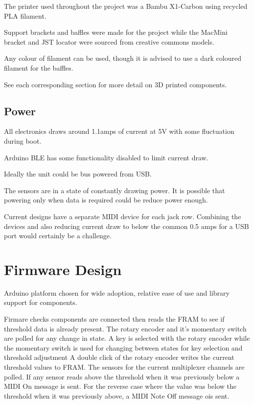 The printer used throughout the project was a Bambu X1-Carbon using
recycled PLA filament.

Support brackets and baffles were made for the project while the MacMini
bracket and JST locator were sourced from creative commons models.

Any colour of filament can be used, though it is advised to use a dark
coloured filament for the baffles.

See each corresponding section for more detail on 3D printed components.

\subsection{Power}\label{power}

All electronics draws around 1.1amps of current at 5V with some
fluctuation during boot.

Arduino BLE has some functionality disabled to limit current draw.

Ideally the unit could be bus powered from USB.

The sensors are in a state of constantly drawing power. It is possible
that powering only when data is required could be reduce power enough.

Current designs have a separate MIDI device for each jack row. Combining
the devices and also reducing current draw to below the common 0.5 amps
for a USB port would certainly be a challenge.

\section{Firmware Design}\label{firmware-design}

Arduino platform chosen for wide adoption, relative ease of use and
library support for components.

Firmare checks components are connected then reads the FRAM to see if
threshold data is already present. The rotary encoder and it's momentary
switch are polled for any change in state. A key is selected with the
rotary encoder while the momentary switch is used for changing between
states for key selection and threshold adjustment A double click of the
rotary encoder writes the current threshold values to FRAM. The sensors
for the current multiplexer channels are polled. If any sensor reads
above the threshold when it was previously below a MIDI On message is
sent. For the reverse case where the value was below the threshold when
it was previously above, a MIDI Note Off message ois sent.

